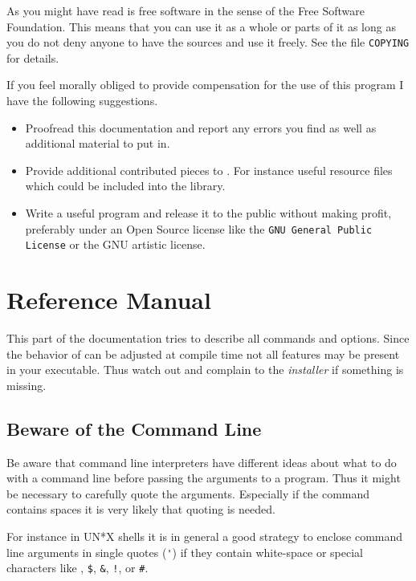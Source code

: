 \documentclass[11pt,a4paper]{scrbook}
\newcommand\LINK[2]{\texttt{#2}}
\begin{document}
As you might have read \BibTool{} is free software in the sense of the Free
Software Foundation. This means that you can use it as a whole or parts of it
as long as you do not deny anyone to have the sources and use it freely. See
the file \LINK{COPYING}{COPYING} for details.

If you feel morally obliged to provide compensation for the use of this
program I have the following suggestions.

\begin{itemize}
\item Proofread this documentation and report any errors you find as well as
  additional material to put in.
\item Provide additional contributed pieces to \BibTool. For instance useful
  resource files which could be included into the library.
\item Write a useful program and release it to the public without making
  profit, preferably under an Open Source license like the \LINK{GPL.html}{GNU
    General Public License} or the GNU artistic license.
\end{itemize}


\appendix
\chapter{Reference Manual}

This part of the documentation tries to describe all commands and options.
Since the behavior of \BibTool{} can be adjusted at compile time not all
features may be present in your executable. Thus watch out and complain to the
\emph{installer} if something is missing.

\section{Beware of the Command Line}

Be aware that command line interpreters have different ideas about what to do
with a command line before passing the arguments to a program. Thus it might
be necessary to carefully quote the arguments. Especially if the command
contains spaces it is very likely that quoting is needed.

For instance in UN*X shells it is in general a good strategy to enclose
command line arguments in single quotes (\verb|'|) if they contain white-space
or special characters like \texttt{}, \texttt{\$}, \texttt{\&},
\verb|!|, or \verb|#|.
\end{document}
